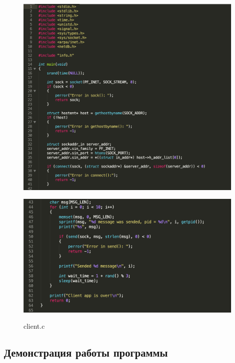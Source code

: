 \documentclass[a4paper,12pt]{article}
\begin{document}
	\begin{figure}[h!]
		\begin{center}
			{\includegraphics[scale = 0.55]{client1_2.png}}
			\label{ris:client_1_2}
		\end{center}
	\end{figure}

	\begin{figure}[h!]
		\begin{center}
			{\includegraphics[scale = 0.6]{client2_2.png}}
			\label{ris:client_2_2}
		\end{center}
		\caption{client.c}
	\end{figure}

	\newpage
	
	\subsection*{Демонстрация работы программы}
	
\end{document}
